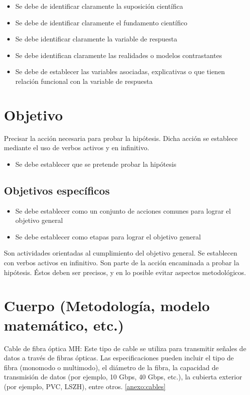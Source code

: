     \begin{itemize}
        \item Se debe de identificar claramente la suposición científica
        \item Se debe de identificar claramente el fundamento científico
        \item Se debe identificar claramente la variable de respuesta
        \item Se debe identifican claramente las realidades o modelos contrastantes
        \item Se debe de establecer las variables asociadas, explicativas o que tienen relación funcional con la variable de respuesta
    \end{itemize}
    \section{Objetivo}
    
    Precisar la acción necesaria para probar la hipótesis. Dicha acción se establece mediante el uso de verbos activos y en infinitivo.
    \begin{itemize}
        \item Se debe establecer que se pretende probar la hipótesis
    \end{itemize}
    
    \subsection{Objetivos específicos }
    
    \begin{itemize}
        \item Se debe establecer como un conjunto de acciones comunes para lograr el objetivo general
        \item Se debe establecer como etapas para lograr el objetivo general
    \end{itemize}
    
    Son actividades orientadas al cumplimiento del objetivo general. Se establecen con verbos activos en infinitivo. Son parte de la acción encaminada a probar la hipótesis. Éstos deben ser precisos, y en lo posible evitar aspectos metodológicos.
    \section{Cuerpo (Metodología, modelo matemático, etc.)}
    
    
    Cable de fibra óptica MH: Este tipo de cable se utiliza para transmitir señales de datos a través de fibras ópticas. Las especificaciones pueden incluir el tipo de fibra (monomodo o multimodo), el diámetro de la fibra, la capacidad de transmisión de datos (por ejemplo, 10 Gbps, 40 Gbps, etc.), la cubierta exterior (por ejemplo, PVC, LSZH), entre otros.
    \ref{anexo:cables}
    
